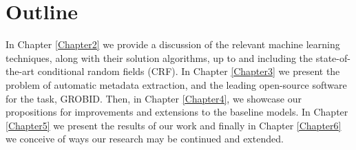 \section{Outline}

In Chapter \ref{Chapter2} we provide a discussion of the relevant machine learning techniques, along with their solution algorithms, up to and including the state-of-the-art conditional random fields (CRF). In Chapter \ref{Chapter3} we present the problem of automatic metadata extraction, and the leading open-source software for the task, GROBID. Then, in Chapter \ref{Chapter4}, we showcase our propositions for improvements and extensions to the baseline models. In Chapter \ref{Chapter5} we present the results of our work and finally in Chapter \ref{Chapter6} we conceive of ways our research may be continued and extended.